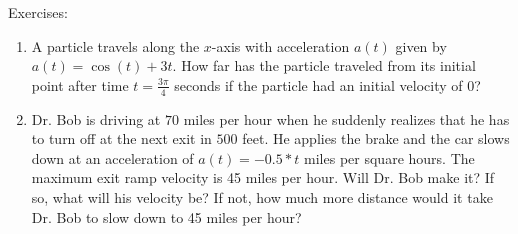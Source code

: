 \documentclass[../revisedmain.tex]{subfiles}
\begin{document}
\begin{center}
	\LARGE Exercises:
\end{center}
\begin{enumerate}
	\item A particle travels along the $x$-axis with acceleration $a(t)$ given by $a(t)=\cos(t)+3t$. How far has the particle traveled from its initial point after time $t=\frac{3\pi}{4}$ seconds if the particle had an initial velocity of 0?
	\item Dr. Bob is driving at $70$ miles per hour when he suddenly realizes that he has to turn off at the next exit in $500$ feet. He applies the brake and the car slows down at an acceleration of $a(t)=-0.5*t$ miles per square hours. The maximum exit ramp velocity is 45 miles per hour. Will Dr. Bob make it? If so, what will his velocity be? If not, how much more distance would it take Dr. Bob to slow down to 45 miles per hour?
\end{enumerate}
\end{document}
